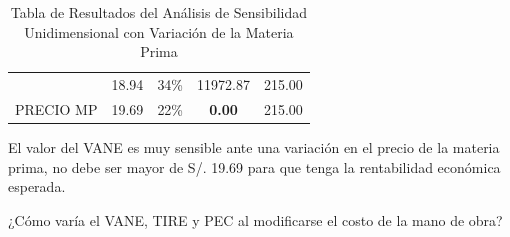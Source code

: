 \documentclass[a4paper,openright,12pt]{book}
\begin{document}
\begin{table}[H]
\begin{tabular}{ccccc}
\cellcolor[HTML]{75BDA7}                            & 18.94                             & 34\%                                  & 11972.87                              & 215.00                               \\
\multirow{-8}{*}{\cellcolor[HTML]{75BDA7}PRECIO MP} & \cellcolor[HTML]{FFFF00}19.69     & 22\%                                  & \textbf{0.00}                         & 215.00                              
\end{tabular}
\caption{Tabla de Resultados del Análisis de Sensibilidad Unidimensional con Variación de la Materia Prima}
\label{Tabla21}
\end{table}

El valor del VANE es muy sensible ante una variación en el precio de la materia prima, no debe ser mayor de S/. 19.69 para que tenga la rentabilidad económica esperada.

¿Cómo varía el VANE, TIRE y PEC al modificarse el costo de la mano de obra?
\end{document}
